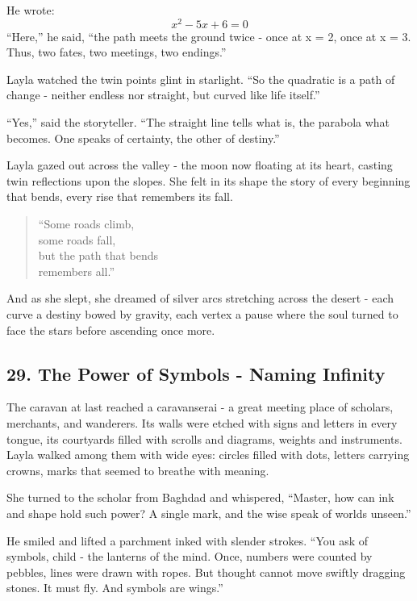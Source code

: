 \documentclass[
  letterpaper,
  DIV=11,
  numbers=noendperiod]{scrreprt}
\begin{document}
He wrote: \[
x^2 - 5x + 6 = 0
\] ``Here,'' he said, ``the path meets the ground twice - once at x = 2,
once at x = 3. Thus, two fates, two meetings, two endings.''

Layla watched the twin points glint in starlight. ``So the quadratic is
a path of change - neither endless nor straight, but curved like life
itself.''

``Yes,'' said the storyteller. ``The straight line tells what is, the
parabola what becomes. One speaks of certainty, the other of destiny.''

Layla gazed out across the valley - the moon now floating at its heart,
casting twin reflections upon the slopes. She felt in its shape the
story of every beginning that bends, every rise that remembers its fall.

\begin{quote}
``Some roads climb,\\
some roads fall,\\
but the path that bends\\
remembers all.''
\end{quote}

And as she slept, she dreamed of silver arcs stretching across the
desert - each curve a destiny bowed by gravity, each vertex a pause
where the soul turned to face the stars before ascending once more.

\subsection{29. The Power of Symbols - Naming
Infinity}\label{the-power-of-symbols---naming-infinity}

The caravan at last reached a caravanserai - a great meeting place of
scholars, merchants, and wanderers. Its walls were etched with signs and
letters in every tongue, its courtyards filled with scrolls and
diagrams, weights and instruments. Layla walked among them with wide
eyes: circles filled with dots, letters carrying crowns, marks that
seemed to breathe with meaning.

She turned to the scholar from Baghdad and whispered, ``Master, how can
ink and shape hold such power? A single mark, and the wise speak of
worlds unseen.''

He smiled and lifted a parchment inked with slender strokes. ``You ask
of symbols, child - the lanterns of the mind. Once, numbers were counted
by pebbles, lines were drawn with ropes. But thought cannot move swiftly
dragging stones. It must fly. And symbols are wings.''
\end{document}

